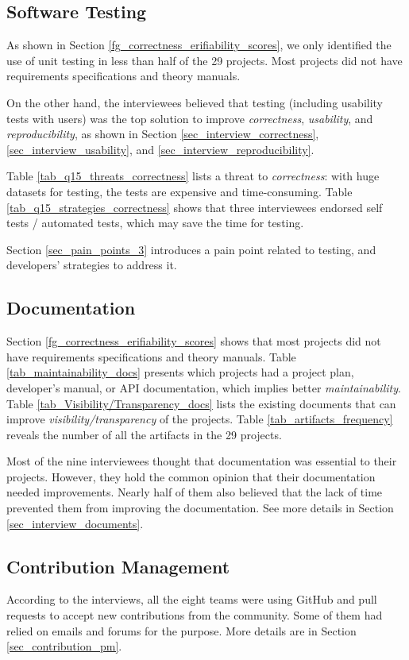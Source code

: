 \subsection{Software Testing}
As shown in Section \ref{fg_correctness_erifiability_scores}, we only identified the use of unit testing in less than half of the 29 projects. Most projects did not have requirements specifications and theory manuals.

On the other hand, the interviewees believed that testing (including usability tests with users) was the top solution to improve \textit{correctness}, \textit{usability}, and \textit{reproducibility}, as shown in Section \ref{sec_interview_correctness}, \ref{sec_interview_usability}, and \ref{sec_interview_reproducibility}.

Table \ref{tab_q15_threats_correctness} lists a threat to \textit{correctness}: with huge datasets for testing, the tests are expensive and time-consuming. Table \ref{tab_q15_strategies_correctness} shows that three interviewees endorsed self tests / automated tests, which may save the time for testing.

Section \ref{sec_pain_points_3} introduces a pain point related to testing, and developers' strategies to address it.

\subsection{Documentation}
Section \ref{fg_correctness_erifiability_scores} shows that most projects did not have requirements specifications and theory manuals. Table \ref{tab_maintainability_docs} presents which projects had a project plan, developer’s manual, or API documentation, which implies better \textit{maintainability}. Table \ref{tab_Visibility/Transparency_docs} lists the existing documents that can improve \textit{visibility/transparency} of the projects. Table \ref{tab_artifacts_frequency} reveals the number of all the artifacts in the 29 projects.

Most of the nine interviewees thought that documentation was essential to their projects. However, they hold the common opinion that their documentation needed improvements. Nearly half of them also believed that the lack of time prevented them from improving the documentation. See more details in Section \ref{sec_interview_documents}.

\subsection{Contribution Management}
According to the interviews, all the eight teams were using GitHub and pull requests to accept new contributions from the community. Some of them had relied on emails and forums for the purpose. More details are in Section \ref{sec_contribution_pm}.

